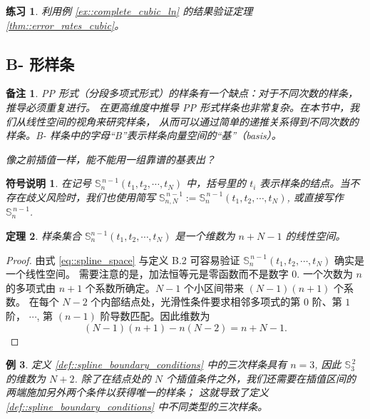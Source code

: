 \documentclass[a4paper]{ctexart}
\newtheorem{theorem}{定理}
\newtheorem{remark}{备注}
\newtheorem{notation}{符号说明}
\newtheorem{example}[theorem]{例}
\newtheorem{exercise}[theorem]{练习}
\numberwithin{theorem}{section}
\numberwithin{equation}{section}
\numberwithin{figure}{section}
\numberwithin{remark}{section}
\begin{document}
\begin{exercise}
    \label{exer::verify_thm312_by_ex38}
利用例 \ref{ex::complete_cubic_ln} 的结果验证定理 \ref{thm::error_rates_cubic}。
\end{exercise}

\subsection{B- 形样条}
\label{sec::b_form_splines}

\begin{remark}
    \label{rem::pp_form_drawback}
PP 形式（分段多项式形式）的样条有一个缺点：对于不同次数的样条，推导必须重复进行。
在更高维度中推导 PP 形式样条也非常复杂。在本节中，我们从线性空间的视角来研究样条，
从而可以通过简单的递推关系得到不同次数的样条。B- 样条中的字母“B”表示样条向量空间的“基”（basis）。

像之前插值一样，能不能用一组靠谱的基表出？
\end{remark}

\begin{notation}
    \label{not::Sn_def}
在记号 $\mathbb{S}^{\,n-1}_n(t_1,t_2,\cdots,t_N)$ 中，括号里的 $t_i$ 表示样条的结点。当不存在歧义风险时，我们也使用简写
$\mathbb{S}^{\,n-1}_{n,N}:=\mathbb{S}^{\,n-1}_n(t_1,t_2,\cdots,t_N)$, 
或直接写作 $\mathbb{S}^{\,n-1}_n$.
\end{notation}

\begin{theorem}
    \label{thm::dim_Sn}
样条集合 $\mathbb{S}^{n-1}_n(t_1,t_2,\cdots,t_N)$ 是一个维数为 $n+N-1$ 的线性空间。
\end{theorem}

\begin{proof}
由式 \eqref{eq::spline_space} 与定义 B.2 可容易验证 $\mathbb{S}^{\,n-1}_n(t_1,t_2,\cdots,t_N)$ 确实是一个线性空间。
需要注意的是，加法恒等元是零函数而不是数字 $0$. 一个次数为 $n$ 的多项式由 $n+1$ 个系数所确定。$N-1$ 个小区间带来 $(N-1)(n+1)$ 个系数。
在每个 $N-2$ 个内部结点处，光滑性条件要求相邻多项式的第 $0$ 阶、第 $1$ 阶， $\cdots$, 第 $(n-1)$ 阶导数匹配。因此维数为
\[
(N-1)(n+1)-n(N-2) = n + N - 1.
\]
\end{proof}

\begin{example}
    \label{ex::cubic_dim}
定义 \ref{def::spline_boundary_conditions} 中的三次样条具有 $n=3$, 因此 $\mathbb{S}^{\,2}_3$ 的维数为 $N+2$. 
除了在结点处的 $N$ 个插值条件之外，我们还需要在插值区间的两端施加另外两个条件以获得唯一的样条；
这就导致了定义 \ref{def::spline_boundary_conditions} 中不同类型的三次样条。
\end{example}
\end{document}
